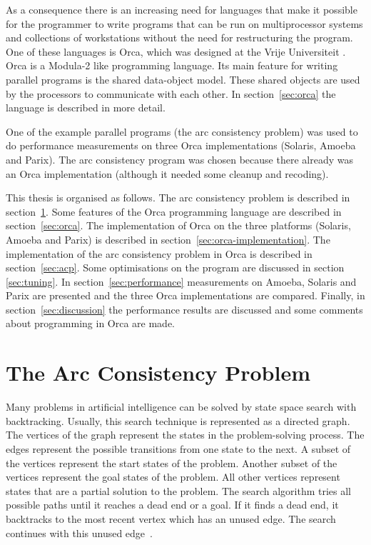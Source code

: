 \documentclass[a4paper,11pt]{article}
\begin{document}
As a consequence there is an increasing need for languages that make it
possible for
the programmer to write programs that can be run on multiprocessor systems
and collections of workstations without the need for restructuring the
program.
One of these languages is Orca, which was designed at the
Vrije Universiteit \cite{bal:thesis}. Orca is
a Modula-2 like programming language. Its main feature for writing
parallel programs is the shared data-object model. These shared objects are
used by the processors to communicate with each other. In
section~\ref{sec:orca} the language is described in more detail.

One of the example parallel programs 
(the arc consistency problem) was used to do performance measurements on
three Orca implementations (Solaris, Amoeba and Parix).
The arc consistency program was chosen because there already was an Orca
implementation (although it needed some cleanup and recoding).

This thesis is organised as follows.
The arc consistency problem is described in section~\ref{sec:theory}.
Some features of the Orca programming language are described in
section~\ref{sec:orca}. The implementation of Orca on the three platforms
(Solaris, Amoeba and Parix) is described in
section~\ref{sec:orca-implementation}.
The implementation of the arc consistency problem in Orca is described in
section~\ref{sec:acp}.
Some optimisations on the program are discussed in section \ref{sec:tuning}.
In section~\ref{sec:performance} measurements on Amoeba, Solaris and Parix
are presented and the three Orca implementations are compared. Finally,
in section~\ref{sec:discussion} the performance results 
are discussed and some comments about
programming in Orca are made.

\section{The Arc Consistency Problem}
\label{sec:theory}
Many problems in artificial intelligence can be solved by state space search
with backtracking. Usually, this search technique is represented as a directed
graph. The vertices of the graph represent the states in the problem-solving
process. The edges represent the possible transitions from one state
to the next. A subset of the vertices represent the start states of the
problem. Another subset of the vertices represent the goal states of the
problem. All other vertices represent states that are a partial solution
to the problem. The search algorithm tries all possible paths until it
reaches a dead end or a goal. If it finds a dead end, it backtracks to the
most recent vertex which has an unused edge. The search continues with this
unused edge~\cite{book:ai}.
\end{document}
